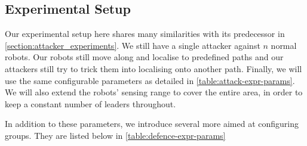 \subsection{Experimental Setup}
Our experimental setup here shares many similarities with its predecessor in \autoref{section:attacker_experiments}. We still have a single attacker against $n$ normal robots. Our robots still move along and localise to predefined paths and our attackers still try to trick them into localising onto another path. Finally, we will use the same configurable parameters as detailed in \autoref{table:attack-expr-params}. We will also extend the robots' sensing range to cover the entire area, in order to keep a constant number of leaders throughout.

In addition to these parameters, we introduce several more aimed at configuring groups. They are listed below in \autoref{table:defence-expr-params}

\begin{table}[!ht]
\centering
{}
\caption{The default parameters used to configure groups in these experiments}
\label{table:defence-expr-params}
\end{table}


